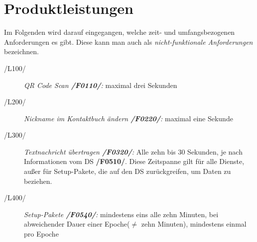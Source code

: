 \section{Produktleistungen}
Im Folgenden wird darauf eingegangen, welche zeit- und umfangsbezogenen Anforderungen es gibt. Diese kann man auch als \textit{nicht-funktionale Anforderungen} bezeichnen.
	\begin{description}
		\item[/L100/]
			\textit{QR Code Scan \textbf{/F0110/}:} 
			\textnormal{maximal drei Sekunden}
		\item[/L200/]
			\textit{Nickname im Kontaktbuch ändern \textbf{/F0220/}:} 
			\textnormal{maximal eine Sekunde}
					\item[/L300/]
			\textit{Textnachricht übertragen \textbf{/F0320/}:} 
			\textnormal{Alle zehn bis 30 Sekunden, je nach Informationen vom \ac{DS} \textbf{/F0510/}. Diese Zeitspanne gilt für alle Dienste, außer für Setup-Pakete, die auf den \ac{DS} zurückgreifen, um Daten zu beziehen.}
				\item[/L400/]
			\textit{Setup-Pakete \textbf{/F0540/}:} 
			\textnormal{mindestens eins alle zehn Minuten, bei abweichender Dauer einer Epoche($\neq$ zehn Minuten), mindestens einmal pro Epoche}

			
			
	\end{description}
